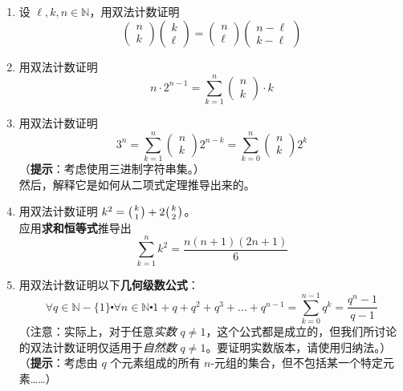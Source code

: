 \begin{enumerate}[label=(\arabic*)]
    \item 设 $\ell,k,n \in \mathbb{N}$，用双法计数证明
        \[\begin{pmatrix}n\\k\end{pmatrix}\begin{pmatrix}k\\\ell\end{pmatrix}=\begin{pmatrix}n\\\ell\end{pmatrix}\begin{pmatrix}n-\ell\\k-\ell\end{pmatrix}\]
    \item 用双法计数证明
        \[n \cdot 2^{n-1} = \sum_{k=1}^{n}\begin{pmatrix}n\\k\end{pmatrix} \cdot k\]
    \item 用双法计数证明
        \[3^n=\sum_{k=1}^{n}\begin{pmatrix}n\\k\end{pmatrix}2^{n-k} = \sum_{k=0}^{n}\begin{pmatrix}n\\k\end{pmatrix}2^k\]
        （\textbf{提示}：考虑使用三进制字符串集。）\\
        然后，解释它是如何从二项式定理推导出来的。
    \item 用双法计数证明 $k^2=\big({k \atop 1}\big)+2\big({k \atop 2}\big)$。\\
        应用\textbf{求和恒等式}推导出
        \[\sum_{k=1}^{n} k^2 = \frac{n(n+1)(2n+1)}{6}\]
    \item 用双法计数证明以下\textbf{几何级数公式}：
    \[\forall q \in \mathbb{N}-\{1\} \centerdot \forall n \in \mathbb{N} \centerdot 1+q+q^2+q^3+\dots+q^{n-1} = \sum_{k=0}^{n-1}q^k = \frac{q^n-1}{q-1}\]
    （注意：实际上，对于任意\emph{实数} $q \ne 1$，这个公式都是成立的，但我们所讨论的双法计数证明仅适用于\emph{自然数} $q \ne 1$。要证明实数版本，请使用归纳法。）\\
    （\textbf{提示}：考虑由 $q$ 个元素组成的所有 $n$-元组的集合，但不包括某一个特定元素……）
\end{enumerate}